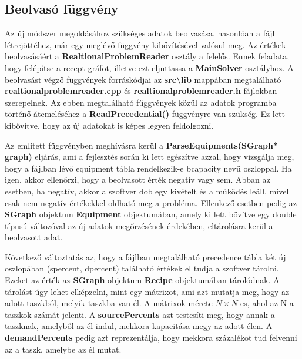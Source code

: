 \subsection{Beolvasó függvény}
Az új módszer megoldásához szükséges adatok beolvasása, hasonlóan a fájl létrejöttéhez, már egy meglévő függvény kibővítésével valósul meg. Az értékek beolvasásáért a \textbf{RealtionalProblemReader} osztály a felelős. Ennek feladata, hogy felépítse a recept gráfot, illetve ezt eljuttassa a \textbf{MainSolver} osztályhoz. A beolvasást végző függvények forráskódjai az \textbf{src\textbackslash lib} mappában megtalálható \textbf{realtionalproblemreader.cpp} és \textbf{realtionalproblemreader.h} fájlokban szerepelnek. Az ebben megtalálható függvények közül az adatok programba történő átemeléséhez a \textbf{ReadPrecedential()} függvényre van szükség. Ez lett kibővítve, hogy az új adatokat is képes legyen feldolgozni. 

Az említett függvényben meghívásra kerül a \textbf{ParseEquipments(SGraph* graph)} eljárás, ami a fejlesztés során ki lett egészítve azzal, hogy vizsgálja meg, hogy a fájlban lévő equipment tábla rendelkezik-e b\textunderscore capacity nevű oszloppal.
Ha igen, akkor ellenőrzi, hogy a beolvasott érték negatív vagy sem. Abban az esetben, ha negatív, akkor a szoftver dob egy kivételt és a működés leáll, mivel csak nem negatív értékekkel oldható meg a probléma. Ellenkező esetben pedig az \textbf{SGraph} objektum \textbf{Equipment} objektumában, amely ki lett bővítve egy double típusú változóval az új adatok megőrzésének érdekében, eltárolásra kerül a beolvasott adat.

Következő változtatás az, hogy a fájlban megtalálható precedence tábla két új oszlopában (s\textunderscore percent, d\textunderscore percent) található értékek el tudja a szoftver tárolni. Ezeket az érték az \textbf{SGraph} objektum \textbf{Recipe} objektumában tárolódnak. A tárolást úgy lehet elképzelni, mint egy mátrixot, ami azt mutatja meg, hogy az adott taszkból, melyik taszkba van él.  A mátrixok mérete $N\times N$-es, ahol az N a taszkok számát jelenti. A \textbf{sourcePercents} azt testesíti meg, hogy annak a taszknak, amelyből az él indul, mekkora kapacitása megy az adott élen. A \textbf{demandPercents} pedig azt reprezentálja, hogy mekkora százalékot tud felvenni az a taszk, amelybe az él mutat.
